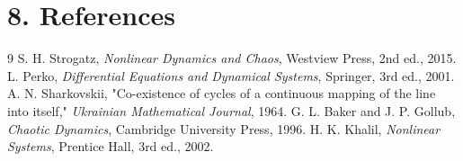 \section*{8. References}


\begin{thebibliography}{9}
 S. H. Strogatz, \emph{Nonlinear Dynamics and Chaos}, Westview Press, 2nd ed., 2015.
 L. Perko, \emph{Differential Equations and Dynamical Systems}, Springer, 3rd ed., 2001.
 A. N. Sharkovskii, "Co-existence of cycles of a continuous mapping of the line into itself," \emph{Ukrainian Mathematical Journal}, 1964.
 G. L. Baker and J. P. Gollub, \emph{Chaotic Dynamics}, Cambridge University Press, 1996.
 H. K. Khalil, \emph{Nonlinear Systems}, Prentice Hall, 3rd ed., 2002.
\end{thebibliography}
